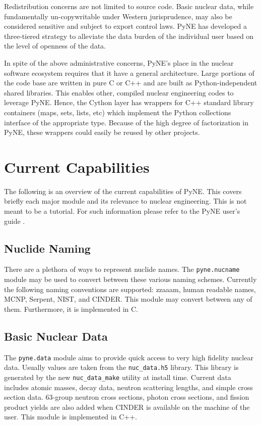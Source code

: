 \documentclass{anstrans}
\begin{document}
Redistribution concerns are not limited to source code.  Basic nuclear data, 
while fundamentally un-copywritable under Western jurisprudence, may also 
be considered sensitive and subject to export control laws.  PyNE has developed
a three-tiered strategy to alleviate the data burden of the individual user based 
on the level of openness of the data. 

In spite of the above administrative concerns, PyNE's place in the nuclear software 
ecosystem requires that it have a general architecture.  Large portions of the code 
base are written in pure C or C++ and are built as Python-independent shared libraries. 
This enables other, compiled nuclear engineering codes to leverage PyNE.  Hence, the 
Cython layer has wrappers for C++ standard library containers (maps, 
sets, lists, etc) which implement the Python collections interface of the 
appropriate type.  Because of the high degree of factorization in PyNE, these wrappers 
could easily be reused by other projects.


\section{Current Capabilities}

The following is an overview of the current capabilities of PyNE.
This covers briefly each major module and its relevance to nuclear 
engineering.  This is not meant to be a tutorial.  For such information
please refer to the PyNE user's guide \cite{PyNE:2012}.

\subsection{Nuclide Naming} 
There are a plethora of ways to represent nuclide names.  The 
\texttt{pyne.nucname} module may be used to convert between these various 
naming schemes. Currently the following naming conventions are supported: 
zzaaam, human readable names, MCNP, Serpent, NIST, and CINDER.  This module 
may convert between any of them.  Furthermore, it is implemented in C.


\subsection{Basic Nuclear Data}
The \texttt{pyne.data} module aims to provide quick access to very high fidelity 
nuclear data. Usually values are taken from the \texttt{nuc\_data.h5} library. 
This library is 
generated by the new \texttt{nuc\_data\_make} utility at install time.  Current 
data includes atomic masses, 
decay data, neutron scattering lengths, and simple cross section data. 63-group
neutron cross sections, photon cross sections, and fission product yields are
also added when CINDER is available on the machine of the user.  This module is 
implemented in C++.
\end{document}
